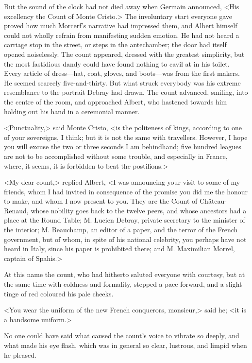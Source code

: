  But the sound of the clock had not died away when Germain announced, <His excellency the Count of Monte Cristo.> The involuntary start everyone gave proved how much Morcerf's narrative had impressed them, and Albert himself could not wholly refrain from manifesting sudden emotion. He had not heard a carriage stop in the street, or steps in the antechamber; the door had itself opened noiselessly. The count appeared, dressed with the greatest simplicity, but the most fastidious dandy could have found nothing to cavil at in his toilet. Every article of dress—hat, coat, gloves, and boots—was from the first makers. He seemed scarcely five-and-thirty. But what struck everybody was his extreme resemblance to the portrait Debray had drawn. The count advanced, smiling, into the centre of the room, and approached Albert, who hastened towards him holding out his hand in a ceremonial manner. 

 <Punctuality,> said Monte Cristo, <is the politeness of kings, according to one of your sovereigns, I think; but it is not the same with travellers. However, I hope you will excuse the two or three seconds I am behindhand; five hundred leagues are not to be accomplished without some trouble, and especially in France, where, it seems, it is forbidden to beat the postilions.> 

 <My dear count,> replied Albert, <I was announcing your visit to some of my friends, whom I had invited in consequence of the promise you did me the honour to make, and whom I now present to you. They are the Count of Château-Renaud, whose nobility goes back to the twelve peers, and whose ancestors had a place at the Round Table; M. Lucien Debray, private secretary to the minister of the interior; M. Beauchamp, an editor of a paper, and the terror of the French government, but of whom, in spite of his national celebrity, you perhaps have not heard in Italy, since his paper is prohibited there; and M. Maximilian Morrel, captain of Spahis.> 

 At this name the count, who had hitherto saluted everyone with courtesy, but at the same time with coldness and formality, stepped a pace forward, and a slight tinge of red coloured his pale cheeks. 

 <You wear the uniform of the new French conquerors, monsieur,> said he; <it is a handsome uniform.> 

 No one could have said what caused the count's voice to vibrate so deeply, and what made his eye flash, which was in general so clear, lustrous, and limpid when he pleased. 

